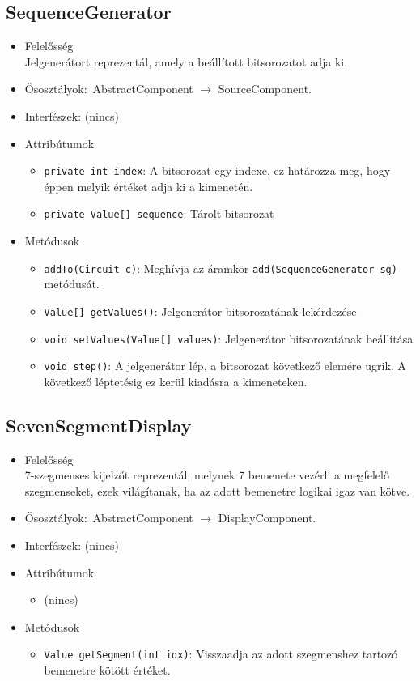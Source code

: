 \subsection{SequenceGenerator}
\begin{itemize}
\item Felelősség\\
Jelgenerátort reprezentál, amely a beállított bitsorozatot adja ki.
\item Ősosztályok:\ AbstractComponent $\rightarrow{}$ SourceComponent.
\item Interfészek: (nincs)
\item Attribútumok $\ $
\begin{itemize}
	\item \texttt{private int index}: A bitsorozat egy indexe, ez határozza meg, hogy éppen melyik értéket adja ki a kimenetén.
	\item \texttt{private Value[] sequence}: Tárolt bitsorozat
\end{itemize}
\item Metódusok$\ $
\begin{itemize}
\item \texttt{addTo(Circuit c)}: Meghívja az áramkör \texttt{add(SequenceGenerator sg)} metódusát.
	\item \texttt{Value[] getValues()}: Jelgenerátor bitsorozatának lekérdezése
	\item \texttt{void setValues(Value[] values)}: Jelgenerátor bitsorozatának beállítása
	\item \texttt{void step()}: A jelgenerátor lép, a bitsorozat következő elemére ugrik. A következő léptetésig ez kerül kiadásra a kimeneteken.
\end{itemize}
\end{itemize}

\subsection{SevenSegmentDisplay}
\begin{itemize}
\item Felelősség\\
7-szegmenses kijelzőt reprezentál, melynek 7 bemenete vezérli a  megfelelő szegmenseket, ezek világítanak, ha az adott bemenetre logikai igaz van kötve.
\item Ősosztályok:\ AbstractComponent $\rightarrow{}$ DisplayComponent.
\item Interfészek: (nincs)
\item Attribútumok $\ $
\begin{itemize}
\item (nincs)
\end{itemize}
\item Metódusok$\ $
\begin{itemize}
	\item \texttt{Value getSegment(int idx)}: Visszaadja az adott szegmenshez tartozó bemenetre kötött értéket.
\end{itemize}
\end{itemize}


